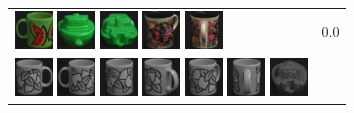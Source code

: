 \begin{figure}[tbp]
\begin{center}
\begin{tabular}{m{11cm} | m{3cm} |}
\includegraphics[width=1cm]{coil/beeld-31.eps}
\includegraphics[width=1cm]{coil/beeld-56.eps}
\includegraphics[width=1cm]{coil/beeld-59.eps}
\includegraphics[width=1cm]{coil/beeld-63.eps}
\includegraphics[width=1cm]{coil/beeld-65.eps}
& {\scriptsize 0.0}
\\
\includegraphics[width=1cm]{coil/beeld-48.eps}
\includegraphics[width=1cm]{coil/beeld-51.eps}
\includegraphics[width=1cm]{coil/beeld-52.eps}
\includegraphics[width=1cm]{coil/beeld-49.eps}
\includegraphics[width=1cm]{coil/beeld-53.eps}
\includegraphics[width=1cm]{coil/beeld-50.eps}
\includegraphics[width=1cm]{coil/beeld-26.eps}

\end{tabular}
\end{center}
\end{figure}
